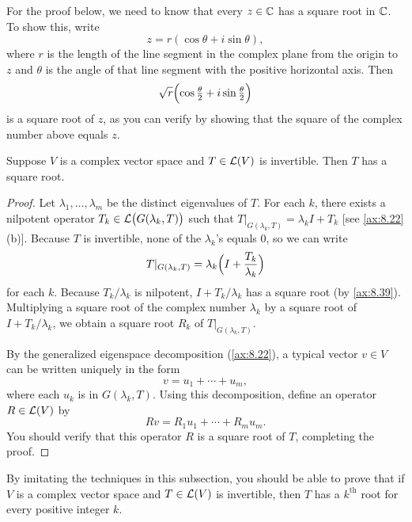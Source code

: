%
For the proof below, we need to know that every $z\in\mathbb{C}$ has a square root in
$\mathbb{C}$. To show this, write
\[ z = r(\cos\theta + i\sin\theta), \]
where $r$ is the length of the line segment in the complex plane from the origin
to $z$ and $\theta$ is the angle of that line segment with the positive
horizontal axis. Then
\[ \sqrt{r}\Bigl(\cos\tfrac{\theta}{2} + i\sin\tfrac{\theta}{2}\Bigr) \]
is a square root of $z$, as you can verify by showing that the square of the
complex number above equals $z$.

\begin{result}\label{ax:8.41}
Suppose $V$ is a complex vector space and $T\in\mathcal{L}(V)$ is invertible. Then $T$
has a square root.
\end{result}

\begin{proof}
Let $\lambda_1,\dots,\lambda_m$ be the distinct eigenvalues of $T$. For each
$k$, there exists a nilpotent operator $T_k\in\mathcal{L}\bigl(G(\lambda_k,T)\bigr)$
such that $T|_{G(\lambda_k,T)}=\lambda_kI+T_k$ [see \ref{ax:8.22}(b)]. Because
$T$ is invertible, none of the $\lambda_k$'s equals $0$, so we can write
\[ T|_{G(\lambda_k,T)} = \lambda_k\Bigl(I+\frac{T_k}{\lambda_k}\Bigr) \]
for each $k$. Because $T_k/\lambda_k$ is nilpotent, $I+T_k/\lambda_k$ has a
square root (by \ref{ax:8.39}). Multiplying a square root of the complex number
$\lambda_k$ by a square root of $I+T_k/\lambda_k$, we obtain a square root
$R_k$ of $T|_{G(\lambda_k,T)}$.

By the generalized eigenspace decomposition (\ref{ax:8.22}), a typical vector
$v\in V$ can be written uniquely in the form
\[ v = u_1+\cdots+u_m, \]
where each $u_k$ is in $G(\lambda_k,T)$. Using this decomposition, define an
operator $R\in\mathcal{L}(V)$ by
\[ Rv = R_1u_1+\cdots+R_mu_m. \]
You should verify that this operator $R$ is a square root of $T$, completing the
proof.
\end{proof}

By imitating the techniques in this subsection, you should be able to prove that
if $V$ is a complex vector space and $T\in\mathcal{L}(V)$ is invertible, then $T$ has a
$k^{\text{th}}$ root for every positive integer $k$.

